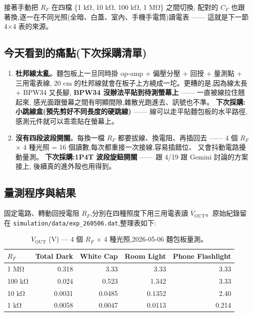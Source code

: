 接著手動把 \(R_F\) 在四檔 \{1 kΩ, 10 kΩ, 100 kΩ, 1 MΩ\} 之間切換,
配對的 \(C_F\) 也跟著換,逐一在不同光照(全暗、白蓋、室內、手機手電筒)讀電表 ——
這就是下一節 4$\times$4 表的來源。

\subsection*{今天看到的痛點(下次採購清單)}

\begin{enumerate}[leftmargin=2em,itemsep=2pt]
  \item \textbf{杜邦線太亂}。麵包板上一旦同時掛 op-amp + 偏壓分壓 + 回授 + 量測點 + 三用電表線,
        20 cm 的杜邦線就會在板子上方繞成一坨。更糟的是,因為線太長 + BPW34 又長腳,
        \textbf{BPW34 沒辦法平貼到待測螢幕上} —— 一直被線拉住翹起來,
        感光面跟螢幕之間有明顯間隙,雜散光跑進去、訊號也不準。
        \textbf{下次採購:小跳線盒(預先剪好不同長度的硬跳線)} —— 線可以走平貼麵包板的水平路徑,
        感測元件就可以乖乖貼在螢幕上。
  \item \textbf{沒有四段波段開關}。每換一檔 \(R_F\) 都要拔線、換電阻、再插回去 ——
        4 個 \(R_F\) × 4 種光照 = 16 個讀數,每次都重接一次接線,容易插錯位、
        又會抖動電路擾動量測。
        \textbf{下次採購:1P4T 波段旋鈕開關} —— 跟 4/19 跟 Gemini 討論的方案接上,
        後續真的進外殼也用得到。
\end{enumerate}

\subsection*{量測程序與結果}

固定電路、轉動回授電阻 \(R_F\),分別在四種照度下用三用電表讀 \(V_\text{OUT}\)。原始紀錄留在
\texttt{simulation/data/exp\_260506.dat},整理表如下:

\begin{table}[H]
  \centering
  \caption{\(V_\text{OUT}\) (V) — 4 個 \(R_F\) × 4 種光照,2026-05-06 麵包板量測。}
  \label{tab:0506-bench}
  \begin{tabular}{lrrrr}
    \toprule
    \(R_F\) & Total Dark & White Cap & Room Light & Phone Flashlight \\
    \midrule
    1 MΩ    & 0.318  & 3.33   & 3.33   & 3.33  \\
    100 kΩ  & 0.024  & 0.523  & 1.342  & 3.33  \\
    10 kΩ   & 0.0031 & 0.0485 & 0.1352 & 2.40  \\
    1 kΩ    & 0.0058 & 0.0047 & 0.0113 & 0.214 \\
    \bottomrule
  \end{tabular}
\end{table}


